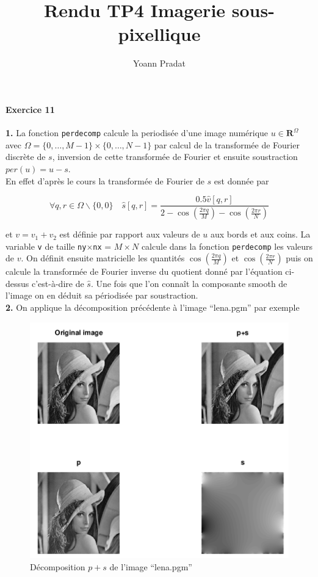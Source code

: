 \documentclass[a4paper, 11pt]{article}
\begin{document}
\title{Rendu TP4 Imagerie sous-pixellique}
\author{Yoann Pradat}
\maketitle

\paragraph{Exercice 11}

\textbf{1.} La fonction \texttt{perdecomp} calcule la periodisée d'une image numérique $u \in \mathbf{R}^{\Omega}$ avec $\Omega =
\{0, \dots, M-1\}\times\{0, \dots, N-1\}$ par calcul de la transformée de Fourier discrète de $s$, inversion de cette
transformée de Fourier et ensuite soustraction $per(u) = u-s$. \\

En effet d'après le cours la transformée de Fourier de $s$ est donnée par

\begin{equation*}
  \forall q,r \in \Omega \backslash \{0,0\} \quad \hat{s}[q,r] = \frac{0.5\hat{v}[q,r]}{2-\cos(\frac{2\pi q}{M}) -
  \cos(\frac{2\pi r}{N})}
\end{equation*}

et $v = v_1 + v_2$ est définie par rapport aux valeurs de $u$ aux bords et aux coins. La variable \texttt{v} de taille
\texttt{ny$\times$nx} = $M\times N$ calcule dans la fonction \texttt{perdecomp} les valeurs de $v$. On définit ensuite matricielle les
quantités $\cos(\frac{2\pi q}{M})$ et $\cos(\frac{2\pi r}{N})$ puis on calcule la transformée de Fourier inverse du
quotient donné par l'équation ci-dessus c'est-à-dire de $\hat{s}$. Une fois que l'on connaît la composante \og smooth
\fg de l'image on en déduit sa périodisée par soustraction. \\

\textbf{2.} On applique la décomposition précédente à l'image “lena.pgm” par exemple

\begin{figure}[!h]
\centering
\includegraphics[width=12cm]{lena_perdecomp.png}
\caption{Décomposition $p+s$ de l'image “lena.pgm”}
\label{fig:decomp}
\end{figure}
\end{document}
